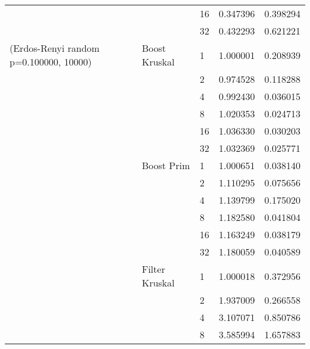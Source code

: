 \begin{tabular}{lllrr}
                                                       &                     & 16 &  0.347396 &  0.398294 \\
                                                       &                     & 32 &  0.432293 &  0.621221 \\
(Erdos-Renyi random p=0.100000, 10000) & Boost Kruskal & 1  &  1.000001 &  0.208939 \\
                                                       &                     & 2  &  0.974528 &  0.118288 \\
                                                       &                     & 4  &  0.992430 &  0.036015 \\
                                                       &                     & 8  &  1.020353 &  0.024713 \\
                                                       &                     & 16 &  1.036330 &  0.030203 \\
                                                       &                     & 32 &  1.032369 &  0.025771 \\
                                                       & Boost Prim & 1  &  1.000651 &  0.038140 \\
                                                       &                     & 2  &  1.110295 &  0.075656 \\
                                                       &                     & 4  &  1.139799 &  0.175020 \\
                                                       &                     & 8  &  1.182580 &  0.041804 \\
                                                       &                     & 16 &  1.163249 &  0.038179 \\
                                                       &                     & 32 &  1.180059 &  0.040589 \\
                                                       & Filter Kruskal & 1  &  1.000018 &  0.372956 \\
                                                       &                     & 2  &  1.937009 &  0.266558 \\
                                                       &                     & 4  &  3.107071 &  0.850786 \\
                                                       &                     & 8  &  3.585994 &  1.657883 \\

\end{tabular}
